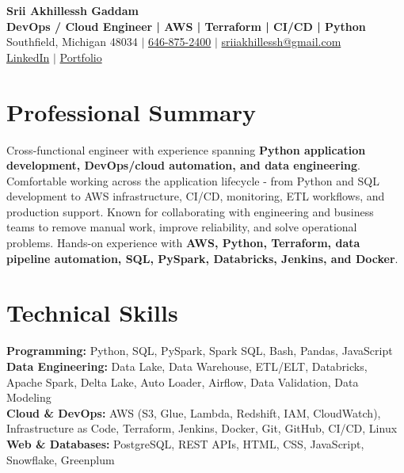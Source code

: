 \documentclass[letterpaper,10pt]{article}
\begin{document}
\fontsize{9.35pt}{10.45pt}\selectfont

\begin{center}
    {\LARGE \textbf{Srii Akhillessh Gaddam}} \\[-1pt]
    \textbf{DevOps / Cloud Engineer | AWS | Terraform | CI/CD | Python} \\[2pt]
    Southfield, Michigan 48034 $|$
    \href{tel:6468752400}{646-875-2400} $|$
    \href{mailto:sriiakhillessh@gmail.com}{sriiakhillessh@gmail.com} \\[1pt]
    \href{https://www.linkedin.com/in/srii-akhiilessh-gaddam-b48668191/}{LinkedIn} $|$
    \href{https://sriiakhillesshg.github.io/portfolio/}{Portfolio}
\end{center}
\vspace{-8pt}

\section{Professional Summary}
\small{Cross-functional engineer with experience spanning \textbf{Python application development, DevOps/cloud automation, and data engineering}. Comfortable working across the application lifecycle - from Python and SQL development to AWS infrastructure, CI/CD, monitoring, ETL workflows, and production support. Known for collaborating with engineering and business teams to remove manual work, improve reliability, and solve operational problems. Hands-on experience with \textbf{AWS, Python, Terraform, data pipeline automation, SQL, PySpark, Databricks, Jenkins, and Docker}.}

\section{Technical Skills}
\small{
\textbf{Programming:} Python, SQL, PySpark, Spark SQL, Bash, Pandas, JavaScript \\
\textbf{Data Engineering:} Data Lake, Data Warehouse, ETL/ELT, Databricks, Apache Spark, Delta Lake, Auto Loader, Airflow, Data Validation, Data Modeling \\
\textbf{Cloud \& DevOps:} AWS (S3, Glue, Lambda, Redshift, IAM, CloudWatch), Infrastructure as Code, Terraform, Jenkins, Docker, Git, GitHub, CI/CD, Linux \\
\textbf{Web \& Databases:} PostgreSQL, REST APIs, HTML, CSS, JavaScript, Snowflake, Greenplum
}
\end{document}

